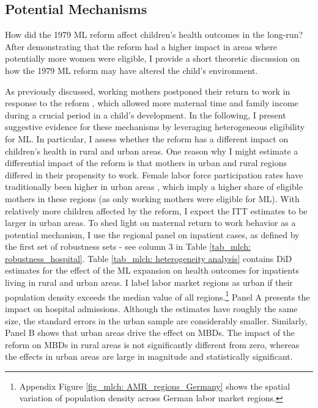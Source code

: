 \subsection{Potential Mechanisms}\label{ref_mlch: discussion_mechanisms}

How did the 1979 ML reform affect children's health outcomes in the long-run? After demonstrating that the reform had a higher impact in areas where potentially more women were eligible, I provide a short theoretic discussion on how the 1979 ML reform may have altered the child's environment.%


As previously discussed, working mothers postponed their return to work in response to the reform \citep{Dustmann2012,schonberg2014expansions}, which allowed more maternal time and family income during a crucial period in a child's development. In the following, I present suggestive evidence for these mechanisms by leveraging heterogeneous eligibility for ML. In particular, I assess whether the reform has a different impact on children's health in rural and urban areas. One reason why I might estimate a differential impact of the reform is that mothers in urban and rural regions differed in their propensity to work. Female labor force participation rates have traditionally been higher in urban areas \citep{bender1993regionale}, which imply a higher share of eligible mothers in these regions (as only working mothers were eligible for ML). With relatively more children affected by the reform, I expect the ITT estimates to be larger in urban areas. To shed light on maternal return to work behavior as a potential mechanism, I use the regional panel on inpatient cases, as defined by the first set of robustness sets - see column 3 in Table \ref{tab_mlch: robustness_hospital}. Table \ref{tab_mlch: heterogeneity analysis} contains DiD estimates for the effect of the ML expansion on health outcomes for inpatients living in rural and urban areas. I label labor market regions as urban if their population density exceeds the median value of all regions.\footnote{Appendix Figure \ref{fig_mlch: AMR_regions_Germany} shows the spatial variation of population density across German labor market regions.} Panel A presents the impact on hospital admissions. Although the estimates have roughly the same size, the standard errors in the urban sample are considerably smaller. Similarly, Panel B shows that urban areas drive the effect on MBDs. The impact of the reform on MBDs in rural areas is not significantly different from zero, whereas the effects in urban areas are large in magnitude and statistically significant.

